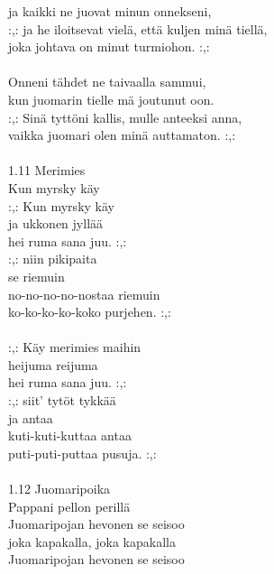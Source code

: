             ja kaikki ne juovat minun onnekseni, \\
            :,: ja he iloitsevat vielä, että kuljen minä tiellä, \\
            joka johtava on minut turmiohon. :,: \\
\hspace{10mm} \\
            Onneni tähdet ne taivaalla sammui, \\
            kun juomarin tielle mä joutunut oon. \\
            :,: Sinä tyttöni kallis, mulle anteeksi anna, \\
            vaikka juomari olen minä auttamaton. :,: \\
\hspace{10mm} \\
1.11 Merimies \\
Kun myrsky käy \\
            :,: Kun myrsky käy \\
            ja ukkonen jyllää \\
            hei ruma sana juu. :,: \\
            :,: niin pikipaita \\
            se riemuin \\
            no-no-no-no-nostaa riemuin \\
            ko-ko-ko-ko-koko purjehen. :,: \\
\hspace{10mm} \\
            :,: Käy merimies maihin \\
            heijuma reijuma \\
            hei ruma sana juu. :,: \\
            :,: siit' tytöt tykkää \\
            ja antaa \\
            kuti-kuti-kuttaa antaa \\
            puti-puti-puttaa pusuja. :,: \\
\hspace{10mm} \\
1.12 Juomaripoika \\
Pappani pellon perillä \\
            Juomaripojan hevonen se seisoo \\
            joka kapakalla, joka kapakalla \\
            Juomaripojan hevonen se seisoo \\
